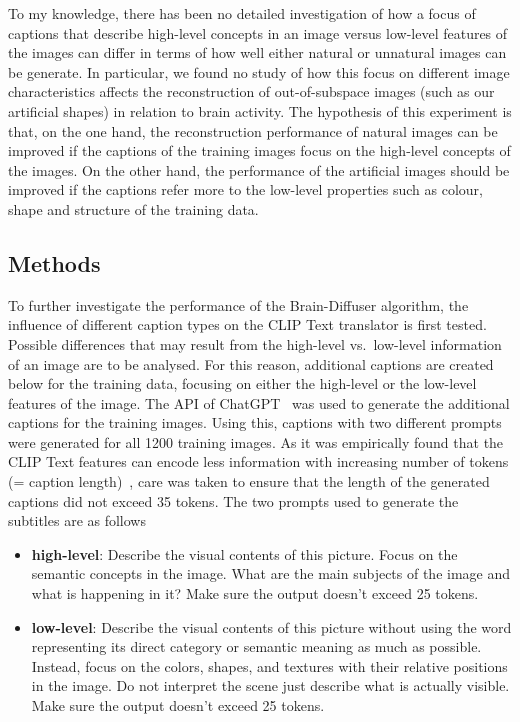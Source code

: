 To my knowledge, there has been no detailed investigation of how a focus of captions that describe high-level concepts in an image versus low-level features of the images can differ in terms of how well either natural or unnatural images can be generate. In particular, we found no study of how this focus on different image characteristics affects the reconstruction of out-of-subspace images (such as our artificial shapes) in relation to brain activity. The hypothesis of this experiment is that, on the one hand, the reconstruction performance of natural images can be improved if the captions of the training images focus on the high-level concepts of the images. On the other hand, the performance of the artificial images should be improved if the captions refer more to the low-level properties such as colour, shape and structure of the training data.


\subsection{Methods}
To further investigate the performance of the Brain-Diffuser algorithm, the influence of different caption types on the CLIP Text translator is first tested. Possible differences that may result from the high-level vs.\ low-level information of an image are to be analysed. For this reason, additional captions are created below for the training data, focusing on either the high-level or the low-level features of the image. The API of ChatGPT~\cite{OpenAI_ChatGPT_2024} was used to generate the additional captions for the training images. Using this, captions with two different prompts were generated for all 1200 training images. As it was empirically found that the CLIP Text features can encode less information with increasing number of tokens (= caption length)~\cite{zhangLongCLIPUnlockingLongText2024}, care was taken to ensure that the length of the generated captions did not exceed 35 tokens. The two prompts used to generate the subtitles are as follows
\begin{itemize}
    \item \textbf{high-level}: Describe the visual contents of this picture. Focus on the semantic concepts in the image. What are the main subjects of the image and what is happening in it? Make sure the output doesn't exceed 25 tokens.
    \item \textbf{low-level}: Describe the visual contents of this picture without using the word representing its direct category or semantic meaning as much as possible. Instead, focus on the colors, shapes, and textures with their relative positions in the image. Do not interpret the scene just describe what is actually visible. Make sure the output doesn't exceed 25 tokens.
\end{itemize}

